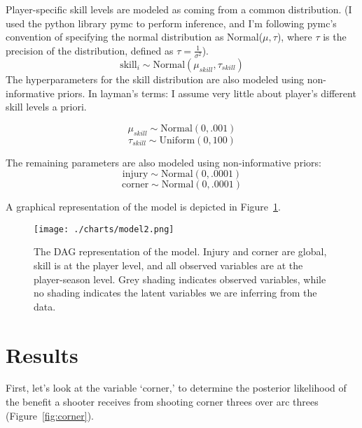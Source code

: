 \documentclass[11pt, oneside]{article}   	%
\begin{document}
Player-specific skill levels are modeled as coming from a common distribution.  (I used the python library pymc to perform inference, and I'm following pymc's convention of specifying the normal distribution as Normal(\(\mu, \tau\)), where \(\tau\) is the precision of the distribution, defined as \(\tau = \frac{1}{\sigma^{2}} \)).
\begin{displaymath}
\text{skill}_i \sim \text{Normal}(\mu_{skill}, \tau_{skill})
\end{displaymath} 
The hyperparameters for the skill distribution are also modeled using non-informative priors.  In layman's terms: I assume very little about player's different skill levels a priori. 

\begin{displaymath}
\mu_{skill} \sim \text{Normal}(0, .001)
\end{displaymath} 
\begin{displaymath}
\tau_{skill} \sim \text{Uniform}(0, 100)
\end{displaymath} 

The remaining parameters are also modeled using non-informative priors: 
\begin{displaymath}
\text{injury} \sim \text{Normal}(0, .0001)
\end{displaymath} 
\begin{displaymath}
\text{corner} \sim \text{Normal}(0, .0001)
\end{displaymath} 

A graphical representation of the model is depicted in Figure~\ref{fig:dag}. 

\begin{figure}[h!]
  \centering
      \texttt{[image: ./charts/model2.png]}
  \caption{The DAG representation of the model.  Injury and corner are global, skill is at the player level, and all observed variables are at the player-season level.  Grey shading indicates observed variables, while no shading indicates the latent variables we are inferring from the data.}
    \label{fig:dag}
\end{figure}



\section{Results}
\label{sec:results}
First, let's look at the variable `corner,' to determine the posterior likelihood of the benefit a shooter receives from shooting corner threes over arc threes (Figure~\ref{fig:corner}).
\end{document}
